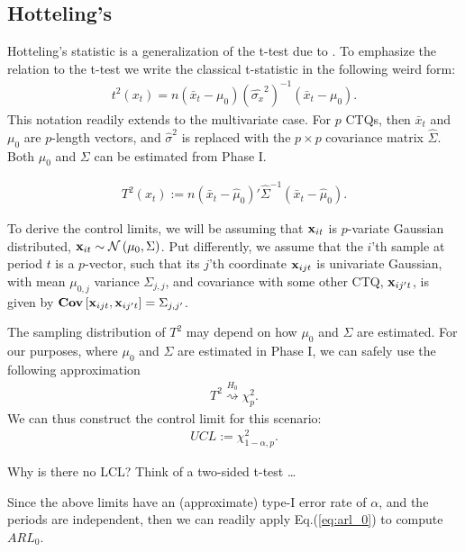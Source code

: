 \subsection[Hotteling's T2]{Hotteling's \tsq}
Hotteling's \tsq statistic is a generalization of the t-test due to \cite{hotelling_generalization_1931}.
To emphasize the relation to the t-test we write the classical t-statistic in the following weird form:
\begin{align}
	t^2(x_t)=n (\bar{x}_t-\mu_0) (\hat{\sigma_x}^2)^{-1} (\bar{x}_t-\mu_0).
\end{align}
This notation readily extends to the multivariate case. 
For $p$ CTQs, then $\bar{x}_t$ and $\mu_0$ are $p$-length vectors, and $\hat{\sigma}^2$ is replaced with the $p \times p$ covariance matrix $\hat{\Sigma}$.
Both $\mu_0$ and $\Sigma$ can be estimated from Phase I. 
\begin{definition}
\begin{align}
\label{eq:hotteling}
	T^2(x_t) := n (\bar{x}_t-\hat{\mu}_0)' \hat{\Sigma}^{-1} (\bar{x}_t-\hat{\mu}_0).
\end{align}
\end{definition}
To derive the control limits, we will be assuming that $\mathbf{x}_{it}$ is $p$-variate Gaussian distributed, $\mathbf{x}_{it}\sim \mathcal{N}\left(\mu_0, \Sigma\right)$. 
Put differently, we assume that the $i$'th sample at period $t$ is a $p$-vector, such that its $j$'th coordinate $\mathbf{x}_{ijt}$ is univariate Gaussian, with mean $\mu_{0,j}$ variance $\Sigma_{j,j}$, and covariance with some other CTQ, $\mathbf{x}_{ij't}$, is given by $\mathbf{Cov} \left[ \mathbf{x}_{ijt},\mathbf{x}_{ij't} \right]=\Sigma_{j,j'}$. 

The sampling distribution of $T^2$ may depend on how $\mu_0$ and $\Sigma$ are estimated. 
For our purposes, where $\mu_0$ and $\Sigma$ are estimated in Phase I, we can safely use the following approximation
\begin{align}
	T^2 \overset{H_0}{\rightsquigarrow }\chi^2_p.
\end{align}
We can thus construct the control limit for this scenario:
\begin{align}
	UCL:= \chi^2_{1-\alpha,p}.
\end{align}

\begin{think}
Why is there no LCL? 
Think of a two-sided t-test \dots
\end{think}

Since the above limits have an (approximate) type-I error rate of $\alpha$, and the periods are independent, then we can readily apply Eq.(\ref{eq:arl_0}) to compute $ARL_0$.


